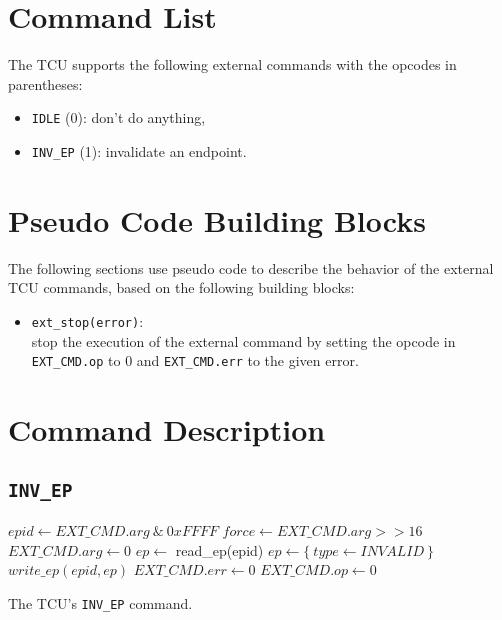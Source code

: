 \section{Command List}

The TCU supports the following external commands with the opcodes in parentheses:

\begin{itemize}
  \item \texttt{IDLE} (0): don't do anything,
  \item \texttt{INV\_EP} (1): invalidate an endpoint.
\end{itemize}

\section{Pseudo Code Building Blocks}
\label{sec:extcmdspseudo}

The following sections use pseudo code to describe the behavior of the external TCU commands, based
on the following building blocks:

\begin{itemize}
  \item \texttt{ext\_stop(error)}:\\
  stop the execution of the external command by setting the opcode in \texttt{EXT\_CMD.op} to 0 and
  \texttt{EXT\_CMD.err} to the given error.
\end{itemize}

\section{Command Description}

\subsection{\texttt{INV\_EP}}

\begin{algorithm}[H]
    $epid \gets EXT\_CMD.arg\ \&\ 0xFFFF$\;
    $force \gets EXT\_CMD.arg >> 16$\;
    \BlankLine
    $EXT\_CMD.arg \gets 0$\;
    \BlankLine
    $ep \gets$ read\_ep(epid)\;
    \BlankLine
    $ep \gets \{~type \gets INVALID~\}$\;
    $write\_ep(epid, ep)$\;
    \BlankLine
    $EXT\_CMD.err \gets 0$\;
    $EXT\_CMD.op \gets 0$\;
    \caption{The TCU's \texttt{INV\_EP} command.}
\end{algorithm}
